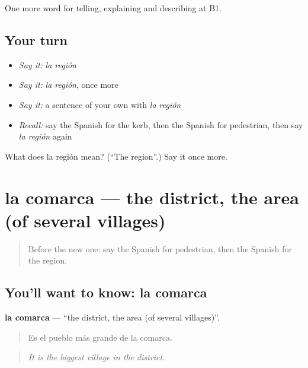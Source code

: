 \begin{grammarlens}[title={What you've built}]
One more word for telling, explaining and describing at B1.
\end{grammarlens}

\subsection*{Your turn}
\begin{itemize}
\raggedright
  \item \emph{Say it:} \emph{la región}
  \item \emph{Say it:} \emph{la región}, once more
  \item \emph{Say it:} a sentence of your own with \emph{la región}
  \item \emph{Recall:} say the Spanish for the kerb, then the Spanish for pedestrian, then say \emph{la región} again
\end{itemize}

\begin{tcolorbox}[breakable,colback=teal!4,colframe=teal!35!black,title={Before you move on}]
What does la región mean? (\textquotedblleft{}The region\textquotedblright{}.) Say it once more.
\end{tcolorbox}
\section[la comarca]{la comarca — the district, the area (of several villages)}

\label{lesson:ES-C683-comarca}



\begin{quote}
Before the new one: say the Spanish for pedestrian, then the Spanish for the region.
\end{quote}

\subsection*{You'll want to know: la comarca}
\textbf{la comarca} — \textquotedblleft{}the district, the area (of several villages)\textquotedblright{}.

\begin{quote}
Es el pueblo más grande de la comarca.
\end{quote}

\begin{quote}
\emph{It is the biggest village in the district.}
\end{quote}

